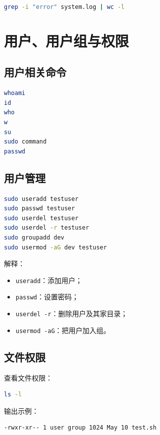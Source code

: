 \documentclass[UTF8,a4paper,12pt]{ctexart}
\begin{document}
\begin{lstlisting}[language=bash]
grep -i "error" system.log | wc -l
\end{lstlisting}

\section{用户、用户组与权限}

\subsection{用户相关命令}

\begin{lstlisting}[language=bash]
whoami
id
who
w
su
sudo command
passwd
\end{lstlisting}

\subsection{用户管理}

\begin{lstlisting}[language=bash]
sudo useradd testuser
sudo passwd testuser
sudo userdel testuser
sudo userdel -r testuser
sudo groupadd dev
sudo usermod -aG dev testuser
\end{lstlisting}

解释：
\begin{itemize}
    \item \texttt{useradd}：添加用户；
    \item \texttt{passwd}：设置密码；
    \item \texttt{userdel -r}：删除用户及其家目录；
    \item \texttt{usermod -aG}：把用户加入组。
\end{itemize}

\subsection{文件权限}

查看文件权限：

\begin{lstlisting}[language=bash]
ls -l
\end{lstlisting}

输出示例：

\begin{lstlisting}
-rwxr-xr-- 1 user group 1024 May 10 test.sh
\end{lstlisting}
\end{document}
